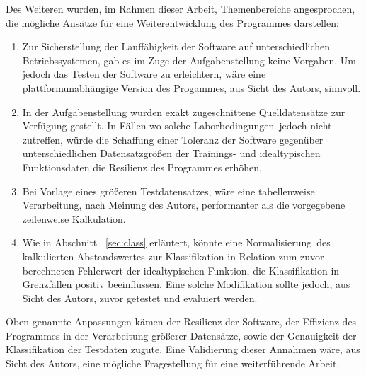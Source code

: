 Des Weiteren wurden, im Rahmen dieser Arbeit, Themenbereiche angesprochen, die mögliche Ansätze für eine Weiterentwicklung des Programmes darstellen:

\begin{enumerate}
 \itemsep0pt
 \item Zur Sicherstellung der Lauffähigkeit der Software auf unterschiedlichen Betriebssystemen, gab es im Zuge der Aufgabenstellung keine Vorgaben. Um jedoch das Testen der Software zu erleichtern, wäre eine plattformunabhängige Version des Progammes, aus Sicht des Autors, sinnvoll.
 \item In der Aufgabenstellung wurden exakt zugeschnittene Quelldatensätze zur Verfügung gestellt. In Fällen wo solche \glqq Laborbedingungen\grqq\ jedoch nicht zutreffen, würde die Schaffung einer Toleranz der Software gegenüber unterschiedlichen Datensatzgrößen der Trainings- und idealtypischen Funktionsdaten die Resilienz des Programmes erhöhen.
 \item Bei Vorlage eines größeren Testdatensatzes, wäre eine tabellenweise Verarbeitung, nach Meinung des Autors, performanter als die vorgegebene zeilenweise Kalkulation.
 \item Wie in Abschnitt ~\ref{sec:class} erläutert, könnte eine \glqq Normalisierung\grqq\ des kalkulierten Abstandswertes zur Klassifikation in Relation zum zuvor berechneten Fehlerwert der idealtypischen Funktion, die Klassifikation in Grenzfällen positiv beeinflussen. Eine solche Modifikation sollte jedoch, aus Sicht des Autors, zuvor getestet und evaluiert werden.
\end{enumerate}

Oben genannte Anpassungen kämen der Resilienz der Software, der Effizienz des Programmes in der Verarbeitung größerer Datensätze, sowie der Genauigkeit der Klassifikation der Testdaten zugute. Eine Validierung dieser Annahmen wäre, aus Sicht des Autors, eine mögliche Fragestellung für eine weiterführende Arbeit. 


